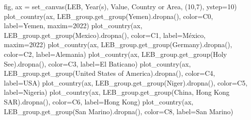 \documentclass[
  letterpaper,
  DIV=11,
  numbers=noendperiod]{scrreprt}
\newenvironment{Shaded}{\begin{snugshade}}{\end{snugshade}}
\newcommand{\DecValTok}[1]{\textcolor[rgb]{0.68,0.00,0.00}{#1}}
\newcommand{\NormalTok}[1]{\textcolor[rgb]{0.00,0.23,0.31}{#1}}
\newcommand{\OperatorTok}[1]{\textcolor[rgb]{0.37,0.37,0.37}{#1}}
\newcommand{\StringTok}[1]{\textcolor[rgb]{0.13,0.47,0.30}{#1}}
\begin{document}
\begin{Shaded}
\begin{Highlighting}[]
\NormalTok{fig, ax }\OperatorTok{=}\NormalTok{ set\_canvas(LEB, }\StringTok{\textquotesingle{}Year(s)\textquotesingle{}}\NormalTok{, }\StringTok{\textquotesingle{}Value\textquotesingle{}}\NormalTok{, }\StringTok{\textquotesingle{}Country or Area\textquotesingle{}}\NormalTok{, (}\DecValTok{10}\NormalTok{,}\DecValTok{7}\NormalTok{), ystep}\OperatorTok{=}\DecValTok{10}\NormalTok{)}
\NormalTok{plot\_country(ax, LEB\_group.get\_group(}\StringTok{\textquotesingle{}Yemen\textquotesingle{}}\NormalTok{).dropna(), color}\OperatorTok{=}\StringTok{\textquotesingle{}C0\textquotesingle{}}\NormalTok{, label}\OperatorTok{=}\StringTok{\textquotesingle{}Yemen\textquotesingle{}}\NormalTok{, maxim}\OperatorTok{=}\DecValTok{2022}\NormalTok{)}
\NormalTok{plot\_country(ax, LEB\_group.get\_group(}\StringTok{\textquotesingle{}Mexico\textquotesingle{}}\NormalTok{).dropna(), color}\OperatorTok{=}\StringTok{\textquotesingle{}C1\textquotesingle{}}\NormalTok{, label}\OperatorTok{=}\StringTok{\textquotesingle{}México\textquotesingle{}}\NormalTok{, maxim}\OperatorTok{=}\DecValTok{2022}\NormalTok{)}
\NormalTok{plot\_country(ax, LEB\_group.get\_group(}\StringTok{\textquotesingle{}Germany\textquotesingle{}}\NormalTok{).dropna(), color}\OperatorTok{=}\StringTok{\textquotesingle{}C2\textquotesingle{}}\NormalTok{, label}\OperatorTok{=}\StringTok{\textquotesingle{}Alemania\textquotesingle{}}\NormalTok{)}
\NormalTok{plot\_country(ax, LEB\_group.get\_group(}\StringTok{\textquotesingle{}Holy See\textquotesingle{}}\NormalTok{).dropna(), color}\OperatorTok{=}\StringTok{\textquotesingle{}C3\textquotesingle{}}\NormalTok{, label}\OperatorTok{=}\StringTok{\textquotesingle{}El Baticano\textquotesingle{}}\NormalTok{)}
\NormalTok{plot\_country(ax, LEB\_group.get\_group(}\StringTok{\textquotesingle{}United States of America\textquotesingle{}}\NormalTok{).dropna(), color}\OperatorTok{=}\StringTok{\textquotesingle{}C4\textquotesingle{}}\NormalTok{, label}\OperatorTok{=}\StringTok{\textquotesingle{}USA\textquotesingle{}}\NormalTok{)}
\NormalTok{plot\_country(ax, LEB\_group.get\_group(}\StringTok{\textquotesingle{}Niger\textquotesingle{}}\NormalTok{).dropna(), color}\OperatorTok{=}\StringTok{\textquotesingle{}C5\textquotesingle{}}\NormalTok{, label}\OperatorTok{=}\StringTok{\textquotesingle{}Nigeria\textquotesingle{}}\NormalTok{)}
\NormalTok{plot\_country(ax, LEB\_group.get\_group(}\StringTok{\textquotesingle{}China, Hong Kong SAR\textquotesingle{}}\NormalTok{).dropna(), color}\OperatorTok{=}\StringTok{\textquotesingle{}C6\textquotesingle{}}\NormalTok{, label}\OperatorTok{=}\StringTok{\textquotesingle{}Hong Kong\textquotesingle{}}\NormalTok{)}
\NormalTok{plot\_country(ax, LEB\_group.get\_group(}\StringTok{\textquotesingle{}San Marino\textquotesingle{}}\NormalTok{).dropna(), color}\OperatorTok{=}\StringTok{\textquotesingle{}C8\textquotesingle{}}\NormalTok{, label}\OperatorTok{=}\StringTok{\textquotesingle{}San Marino\textquotesingle{}}\NormalTok{)}
\end{Highlighting}
\end{Shaded}
\end{document}
